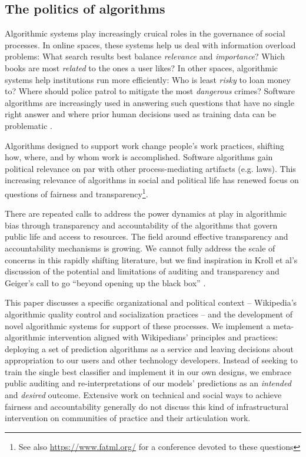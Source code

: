 \subsection{The politics of algorithms}
Algorithmic systems play increasingly cruical roles in the governance of social processes\cite{gillespie2014relevance}.  In online spaces, these systems help us deal with information overload problems: What search results best balance \emph{relevance} and \emph{importance}?  Which books are most \emph{related} to the ones a user likes?  In other spaces, algorithmic systems help institutions run more efficiently: Who is least \emph{risky} to loan money to?  Where should police patrol to mitigate the most \emph{dangerous} crimes?  Software algorithms are increasingly used in answering such questions that have no single right answer and where prior human decisions used as training data can be problematic \cite{barocas2013governing,tufekci2015algorithms}.

Algorithms designed to support work change people's work practices, shifting how, where, and by whom work is accomplished\cite{crawford2016algorithm, gillespie2014relevance, zuboff1988age}.  Software algorithms gain political relevance on par with other process-mediating artifacts (e.g. laws\cite{lessig1999code}).  This increasing relevance of algorithms in social and political life has renewed focus on questions of fairness and transparency\footnote{See also \url{https://www.fatml.org/} for a conference devoted to these questions}.

There are repeated calls to address the power dynamics at play in algorithmic bias through transparency and accountability of the algorithms that govern public life and access to resources\cite{diakopoulos2017algorithmic,sandvig2014auditing}.  The field around effective transparency and accountability mechanisms is growing.  We cannot fully address the scale of concerns in this rapidly shifting literature, but we find inspiration in Kroll et al's discussion of the potential and limitations of auditing and transparency\cite{kroll2016accountable} and Geiger's call to go ``beyond opening up the black box'' \cite{geiger2017beyond}.

This paper discusses a specific organizational and political context -- Wikipedia's algorithmic quality control and socialization practices -- and the development of novel algorithmic systems for support of these processes.  We implement a meta-algorithmic intervention aligned with Wikipedians' principles and practices: deploying a set of prediction algorithms as a service and leaving decisions about appropriation to our users and other technology developers.  Instead of seeking to train the single best classifier and implement it in our own designs, we embrace public auditing and re-interpretations of our models' predictions as an \emph{intended} and \emph{desired} outcome.  Extensive work on technical and social ways to achieve fairness and accountability generally do not discuss this kind of infrastructural intervention on communities of practice and their articulation work.

